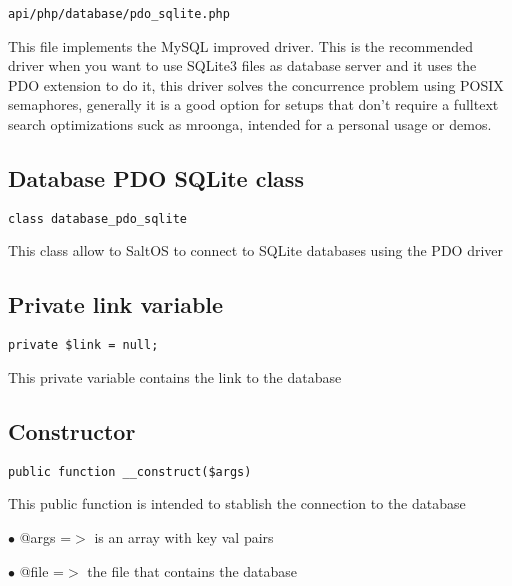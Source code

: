 \documentclass[a4paper]{book}
\begin{document}
\begin{lstlisting}
api/php/database/pdo_sqlite.php
\end{lstlisting}

This file implements the MySQL improved driver. This is the recommended driver when you want
to use SQLite3 files as database server and it uses the PDO extension to do it, this driver
solves the concurrence problem using POSIX semaphores, generally it is a good option for setups
that don't require a fulltext search optimizations suck as mroonga, intended for a personal
usage or demos.

\hypertarget{toc378}{}
\subsection{Database PDO SQLite class}

\begin{lstlisting}
class database_pdo_sqlite
\end{lstlisting}

This class allow to SaltOS to connect to SQLite databases using the PDO driver

\hypertarget{toc379}{}
\subsection{Private link variable}

\begin{lstlisting}
private $link = null;
\end{lstlisting}

This private variable contains the link to the database

\hypertarget{toc380}{}
\subsection{Constructor}

\begin{lstlisting}
public function __construct($args)
\end{lstlisting}

This public function is intended to stablish the connection to the database

\begin{compactitem}
\item[\color{myblue}$\bullet$] @args =$>$ is an array with key val pairs
\item[\color{myblue}$\bullet$] @file =$>$ the file that contains the database
\end{compactitem}
\end{document}
